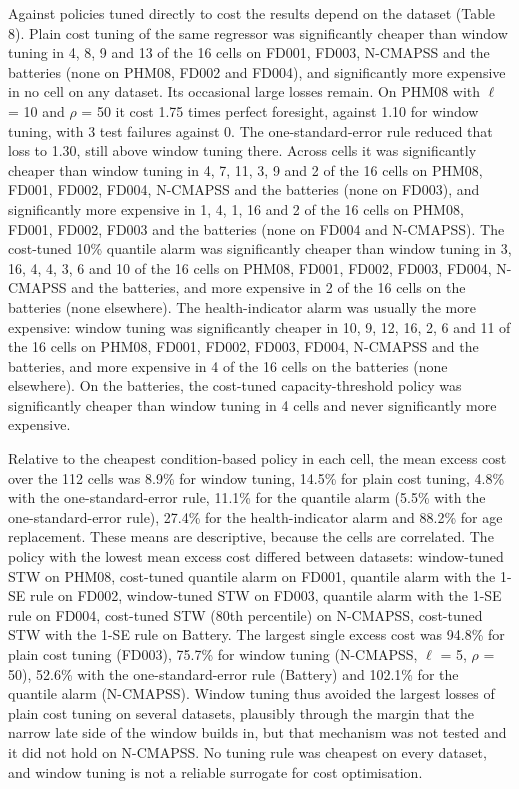 \documentclass[a4paper,fleqn,doubleblind]{cas-dc}
\begin{document}
Against policies tuned directly to cost the results depend on the dataset (Table 8). Plain cost tuning of the same regressor was significantly cheaper than window tuning in 4, 8, 9 and 13 of the 16 cells on FD001, FD003, N-CMAPSS and the batteries (none on PHM08, FD002 and FD004), and significantly more expensive in no cell on any dataset. Its occasional large losses remain. On PHM08 with $\ell$ = 10 and $\rho$ = 50 it cost 1.75 times perfect foresight, against 1.10 for window tuning, with 3 test failures against 0. The one-standard-error rule reduced that loss to 1.30, still above window tuning there. Across cells it was significantly cheaper than window tuning in 4, 7, 11, 3, 9 and 2 of the 16 cells on PHM08, FD001, FD002, FD004, N-CMAPSS and the batteries (none on FD003), and significantly more expensive in 1, 4, 1, 16 and 2 of the 16 cells on PHM08, FD001, FD002, FD003 and the batteries (none on FD004 and N-CMAPSS). The cost-tuned 10\% quantile alarm was significantly cheaper than window tuning in 3, 16, 4, 4, 3, 6 and 10 of the 16 cells on PHM08, FD001, FD002, FD003, FD004, N-CMAPSS and the batteries, and more expensive in 2 of the 16 cells on the batteries (none elsewhere). The health-indicator alarm was usually the more expensive: window tuning was significantly cheaper in 10, 9, 12, 16, 2, 6 and 11 of the 16 cells on PHM08, FD001, FD002, FD003, FD004, N-CMAPSS and the batteries, and more expensive in 4 of the 16 cells on the batteries (none elsewhere). On the batteries, the cost-tuned capacity-threshold policy was significantly cheaper than window tuning in 4 cells and never significantly more expensive.

Relative to the cheapest condition-based policy in each cell, the mean excess cost over the 112 cells was 8.9\% for window tuning, 14.5\% for plain cost tuning, 4.8\% with the one-standard-error rule, 11.1\% for the quantile alarm (5.5\% with the one-standard-error rule), 27.4\% for the health-indicator alarm and 88.2\% for age replacement. These means are descriptive, because the cells are correlated. The policy with the lowest mean excess cost differed between datasets: window-tuned STW on PHM08, cost-tuned quantile alarm on FD001, quantile alarm with the 1-SE rule on FD002, window-tuned STW on FD003, quantile alarm with the 1-SE rule on FD004, cost-tuned STW (80th percentile) on N-CMAPSS, cost-tuned STW with the 1-SE rule on Battery. The largest single excess cost was 94.8\% for plain cost tuning (FD003), 75.7\% for window tuning (N-CMAPSS, $\ell$ = 5, $\rho$ = 50), 52.6\% with the one-standard-error rule (Battery) and 102.1\% for the quantile alarm (N-CMAPSS). Window tuning thus avoided the largest losses of plain cost tuning on several datasets, plausibly through the margin that the narrow late side of the window builds in, but that mechanism was not tested and it did not hold on N-CMAPSS. No tuning rule was cheapest on every dataset, and window tuning is not a reliable surrogate for cost optimisation.
\end{document}
